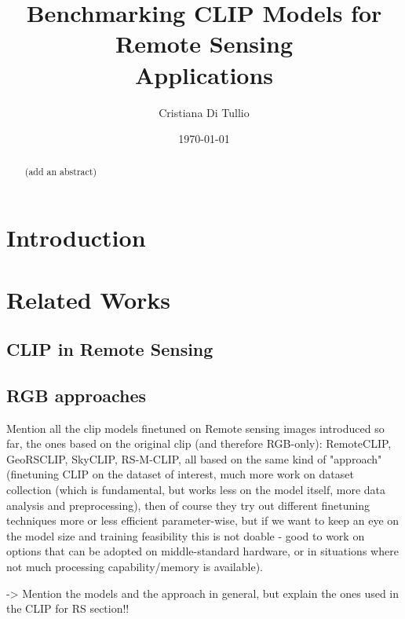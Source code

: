 \documentclass[a4paper, oneside, english]{sapthesis}
\title{Benchmarking CLIP Models for Remote Sensing \\Applications}
\author{Cristiana Di Tullio}
\date{\today}
\begin{document}
\frontmatter
\maketitle
\dedication{(add a dedication)}

\begin{abstract}
    (add an abstract)
\end{abstract}

\tableofcontents

\mainmatter

\chapter{Introduction} %


\chapter{Related Works} %
\section{CLIP in Remote Sensing}
\section{RGB approaches}

Mention all the clip models finetuned on Remote sensing images introduced so far, the ones based on the original clip (and therefore RGB-only): RemoteCLIP, GeoRSCLIP, SkyCLIP, RS-M-CLIP, all based on the same kind of "approach" (finetuning CLIP on the dataset of interest, much more work on dataset collection (which is fundamental, but works less on the model itself, more data analysis and preprocessing), then of course they try out different finetuning techniques more or less efficient parameter-wise, but if we want to keep an eye on the model size and training feasibility this is not doable - good to work on options that can be adopted on middle-standard hardware, or in situations where not much processing capability/memory is available).

-> Mention the models and the approach in general, but explain the ones used in the CLIP for RS section!!
\end{document}
